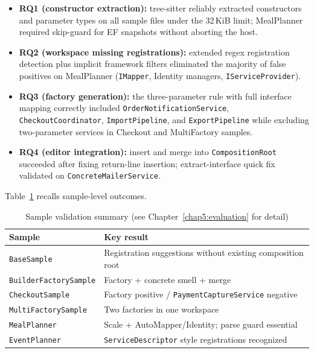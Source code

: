 \begin{itemize}
	\item \textbf{RQ1 (constructor extraction):} tree-sitter reliably extracted constructors and parameter types on all sample files under the 32\,KiB limit; MealPlanner required skip-guard for EF snapshots without aborting the host.
	\item \textbf{RQ2 (workspace missing registrations):} extended regex registration detection plus implicit framework filters eliminated the majority of false positives on MealPlanner (\texttt{IMapper}, Identity managers, \texttt{IServiceProvider}).
	\item \textbf{RQ3 (factory generation):} the three-parameter rule with full interface mapping correctly included \texttt{OrderNotificationService}, \texttt{CheckoutCoordinator}, \texttt{ImportPipeline}, and \texttt{ExportPipeline} while excluding two-parameter services in Checkout and MultiFactory samples.
	\item \textbf{RQ4 (editor integration):} insert and merge into \texttt{CompositionRoot} succeeded after fixing return-line insertion; extract-interface quick fix validated on \texttt{ConcreteMailerService}.
\end{itemize}

Table~\ref{tab:conclusions-samples} recalls sample-level outcomes.

\begin{table}[htbp]
\centering
\caption{Sample validation summary (see Chapter~\ref{chap5:evaluation} for detail)}
\label{tab:conclusions-samples}
\begin{tabular}{|l|p{10cm}|}
\hline
\textbf{Sample} & \textbf{Key result} \\
\hline
\texttt{BaseSample} & Registration suggestions without existing composition root \\
\hline
\texttt{BuilderFactorySample} & Factory + concrete smell + merge \\
\hline
\texttt{CheckoutSample} & Factory positive / \texttt{PaymentCaptureService} negative \\
\hline
\texttt{MultiFactorySample} & Two factories in one workspace \\
\hline
\texttt{MealPlanner} & Scale + AutoMapper/Identity; parse guard essential \\
\hline
\texttt{EventPlanner} & \texttt{ServiceDescriptor} style registrations recognized \\
\hline
\end{tabular}
\end{table}

